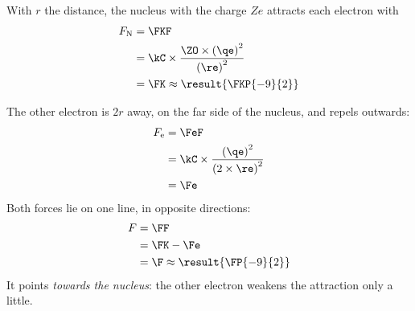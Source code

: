 \begin{abcliste}
\abc With $r$ the distance, the nucleus with the charge $Z e$ attracts each electron with
\begin{align}
 F_\mathrm{N} &= \FKF \\
   &= \kC\times\frac{\ZO\times\left(\qe\right)^2}{\left(\re\right)^2} \\
   &= \FK \approx \result{\FKP{-9}{2}}
\end{align}

\abc
\begin{center}
\end{center}
The other electron is $2r$ away, on the far side of the nucleus, and repels outwards:
\begin{align}
 F_\mathrm{e} &= \FeF \\
   &= \kC\times\frac{\left(\qe\right)^2}{\left(2\times\re\right)^2} \\
   &= \Fe
\end{align}
Both forces lie on one line, in opposite directions:
\begin{align}
 F &= \FF \\
   &= \FK - \Fe \\
   &= \F \approx \result{\FP{-9}{2}}
\end{align}
It points \emph{towards the nucleus}: the other electron weakens the attraction only a little.
\end{abcliste}
